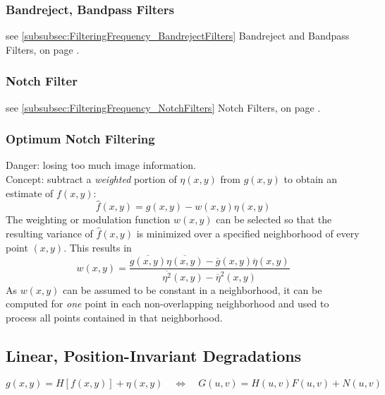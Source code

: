 \subsubsection{Bandreject, Bandpass Filters}
see \ref{subsubsec:FilteringFrequency_BandrejectFilters} Bandreject and Bandpass Filters, on page \pageref{subsubsec:FilteringFrequency_BandrejectFilters}.

\subsubsection{Notch Filter }
see \ref{subsubsec:FilteringFrequency_NotchFilters} Notch Filters, on page \pageref{subsubsec:FilteringFrequency_NotchFilters}.

\subsubsection{Optimum Notch Filtering }
Danger: losing too much image information. \\
Concept: subtract a \textit{weighted} portion of $\eta(x,y)$ from $g(x,y)$ to obtain an estimate of $f(x,y)$:
\begin{equation}
	\hat{f}(x,y) = g(x,y) - w(x,y) \eta(x,y)
\end{equation}
The weighting or modulation function $w(x,y)$ can be selected so that the resulting variance of $\hat{f}(x,y)$ is minimized over a specified neighborhood of every point $(x,y)$. This results in
\begin{equation}
	w(x,y) = \frac{\overline{g(x,y)} \overline{\eta(x,y)} - \overline{g}(x,y)\overline{\eta}(x,y)}{\overline{\eta^2}(x,y) - \overline{\eta}^2(x,y)}
\end{equation}
As $w(x,y)$ can be assumed to be constant in a neighborhood, it can be computed for \textit{one} point in each non-overlapping neighborhood and used to process all points contained in that neighborhood.


\subsection{Linear, Position-Invariant Degradations }
	\[
		g(x,y) = H[f(x,y)] + \eta(x,y) \quad
		\Leftrightarrow \quad
		G(u,v) = H(u,v)F(u,v) + N(u,v)
	\]

